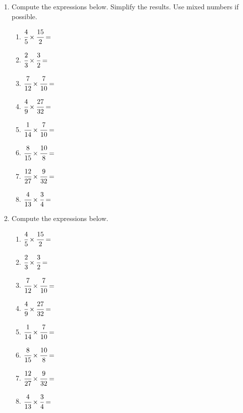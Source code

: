 \documentclass[12pt,letterpaper]{article}
\begin{document}
\begin{enumerate}
    \item Compute the expressions below. Simplify the results. Use mixed numbers if possible.
    \begin{multicols}{2}
    \begin{enumerate}
        \item $\cfrac{4}{5}\times\cfrac{15}{2}=$
        \item $\cfrac{2}{3}\times\cfrac{3}{2}=$
        \item $\cfrac{7}{12}\times\cfrac{7}{10}=$
        \item $\cfrac{4}{9}\times\cfrac{27}{32}=$
        \item $\cfrac{1}{14}\times\cfrac{7}{10}=$
        \item $\cfrac{8}{15}\times\cfrac{10}{8}=$
        \item $\cfrac{12}{27}\times\cfrac{9}{32}=$
        \item $\cfrac{4}{13}\times\cfrac{3}{4}=$
    \end{enumerate}
    \end{multicols}

    \item Compute the expressions below.
    \begin{multicols}{2}
    \begin{enumerate}
        \item $\cfrac{4}{5}\times\cfrac{15}{2}=$
        \item $\cfrac{2}{3}\times\cfrac{3}{2}=$
        \item $\cfrac{7}{12}\times\cfrac{7}{10}=$
        \item $\cfrac{4}{9}\times\cfrac{27}{32}=$
        \item $\cfrac{1}{14}\times\cfrac{7}{10}=$
        \item $\cfrac{8}{15}\times\cfrac{10}{8}=$
        \item $\cfrac{12}{27}\times\cfrac{9}{32}=$
        \item $\cfrac{4}{13}\times\cfrac{3}{4}=$
    \end{enumerate}
    \end{multicols}
\end{enumerate}
\end{document}
